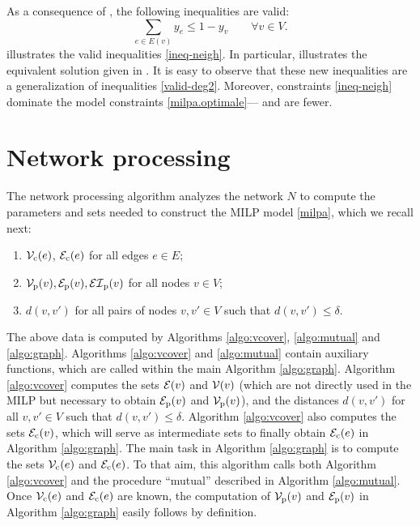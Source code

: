 As a consequence of , the following inequalities are valid:
\begin{equation}
	\sum_{e\in E(v)} y_e \leq 1-y_v \qquad \forall v\in V. \label{ineq-neigh}
\end{equation}
 illustrates the valid inequalities \eqref{ineq-neigh}. In particular,  illustrates the equivalent solution given in . It is easy to observe that these new inequalities are a generalization of inequalities \eqref{valid-deg2}. Moreover, constraints \eqref{ineq-neigh} dominate the model constraints  \eqref{milpa.optimale}--- and are fewer.



\section{Network processing}\label{sec:prepro}
The network processing algorithm analyzes
the network $N$ to compute the parameters and sets needed to construct the MILP model \eqref{milpa}, which we recall next:

\begin{enumerate}
	\item $\mathcal V_{\mathrm{c}}(e)$, ${\mathcal E}_{\mathrm{c}}(e)$ for all edges $e \in E$;
	\item $\mathcal V_{\mathrm{p}}(v), {\mathcal E}_{\mathrm{p}}(v), {\mathcal {EI}}_{\mathrm{p}}(v)$ for all nodes $v \in V$;
	\item $d(v,v')$ for all pairs of nodes $v,v' \in V$ such that $d(v,v') \le \delta$.
\end{enumerate}

The above data is computed by Algorithms \ref{algo:vcover}, \ref{algo:mutual}  and \ref{algo:graph}. Algorithms \ref{algo:vcover} and \ref{algo:mutual} contain auxiliary functions, which are called within the main Algorithm \ref{algo:graph}. Algorithm \ref{algo:vcover} computes the sets  ${\mathcal E}(v)$ and $\mathcal V(v)$ (which are not directly used in the MILP but necessary to obtain ${\mathcal E}_{\mathrm{p}}(v)$ and $\mathcal V_{\mathrm{p}}(v)$), and the distances $d(v,v')$ for all $v,v'\in V$ such that $d(v,v')\leq \delta$. Algorithm \ref{algo:vcover} also computes the sets ${\mathcal E}_{\mathrm{c}}(v)$,
which will serve as intermediate sets to finally obtain ${\mathcal E}_{\mathrm{c}}(e)$ in Algorithm \ref{algo:graph}.  The main task in Algorithm \ref{algo:graph} is to compute the sets  $\mathcal V_{\mathrm{c}}(e)$ and ${\mathcal E}_{\mathrm{c}}(e)$. To that aim, this algorithm calls both Algorithm \ref{algo:vcover} and the procedure ``mutual'' described in Algorithm \ref{algo:mutual}. Once  $\mathcal V_{\mathrm{c}}(e)$ and ${\mathcal E}_{\mathrm{c}}(e)$ are known, the computation of $\mathcal V_{\mathrm{p}}(v)$ and ${\mathcal E}_{\mathrm{p}}(v)$ in Algorithm \ref{algo:graph} easily follows by definition.


